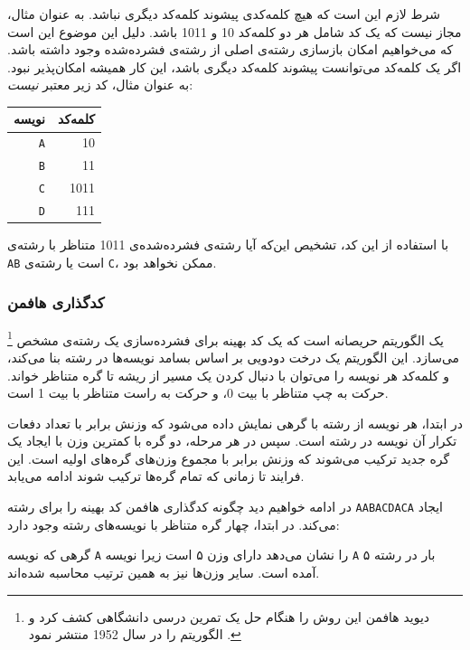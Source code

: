 شرط لازم این است که هیچ کلمه‌کدی
پیشوند کلمه‌کد دیگری نباشد.
به عنوان مثال، مجاز نیست که یک کد
شامل هر دو کلمه‌کد 10
و 1011 باشد.
دلیل این موضوع این است که می‌خواهیم
امکان بازسازی رشته‌ی اصلی
از رشته‌ی فشرده‌شده وجود داشته باشد.
اگر یک کلمه‌کد می‌توانست پیشوند کلمه‌کد دیگری باشد،
این کار همیشه امکان‌پذیر نبود.
به عنوان مثال، کد زیر معتبر \emph{نیست}:
\begin{center}
\begin{tabular}{rr}
نویسه & کلمه‌کد \\
\hline
\texttt{A} & 10 \\
\texttt{B} & 11 \\
\texttt{C} & 1011 \\
\texttt{D} & 111 \\
\end{tabular}
\end{center}
با استفاده از این کد، تشخیص این‌که
آیا رشته‌ی فشرده‌شده‌ی 1011 متناظر با
رشته‌ی \texttt{AB} است یا رشته‌ی \texttt{C}، ممکن نخواهد بود.


\subsubsection{کدگذاری هافمن}

\footnote{دیوید هافمن این روش را
هنگام حل یک تمرین درسی دانشگاهی کشف کرد
و الگوریتم را در سال 1952 منتشر نمود \cite{huf52}.} یک الگوریتم حریصانه است
که یک کد بهینه برای
فشرده‌سازی یک رشته‌ی مشخص می‌سازد.
این الگوریتم یک درخت دودویی
بر اساس بسامد نویسه‌ها
در رشته بنا می‌کند،
و کلمه‌کد هر نویسه را می‌توان
با دنبال کردن یک مسیر از ریشه تا
گره متناظر خواند.
حرکت به چپ متناظر با بیت 0،
و حرکت به راست متناظر با بیت 1 است.

در ابتدا، هر نویسه از رشته با گرهی نمایش داده می‌شود که وزنش برابر با تعداد دفعات تکرار آن نویسه در رشته است.
سپس در هر مرحله، دو گره با کمترین وزن با ایجاد یک گره جدید ترکیب می‌شوند که وزنش برابر با مجموع وزن‌های گره‌های اولیه است.
این فرایند تا زمانی که تمام گره‌ها ترکیب شوند ادامه می‌یابد.

در ادامه خواهیم دید چگونه کدگذاری هافمن کد بهینه را برای رشته
\texttt{AABACDACA}
ایجاد می‌کند.
در ابتدا، چهار گره متناظر با نویسه‌های رشته وجود دارد:

\begin{center}
\end{center}
گرهی که نویسه \texttt{A} را نشان می‌دهد دارای وزن ۵ است زیرا نویسه \texttt{A} ۵ بار در رشته آمده است.
سایر وزن‌ها نیز به همین ترتیب محاسبه شده‌اند.

